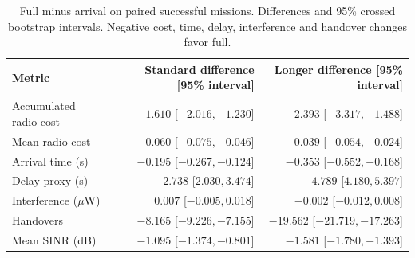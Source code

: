 \begin{table}[!t]\centering
\caption{Full minus arrival on paired successful missions. Differences and 95\% crossed bootstrap intervals. Negative cost, time, delay, interference and handover changes favor full.}
\label{tab:pairedradio}
\begin{tabular}{lrr}\toprule
Metric & Standard difference [95\% interval] & Longer difference [95\% interval]\\\midrule
Accumulated radio cost & $-1.610$ [$ -2.016, -1.230 $] & $-2.393$ [$ -3.317, -1.488 $]\\
Mean radio cost & $-0.060$ [$ -0.075, -0.046 $] & $-0.039$ [$ -0.054, -0.024 $]\\
Arrival time (s) & $-0.195$ [$ -0.267, -0.124 $] & $-0.353$ [$ -0.552, -0.168 $]\\
Delay proxy (s) & $2.738$ [$ 2.030, 3.474 $] & $4.789$ [$ 4.180, 5.397 $]\\
Interference ($\mu$W) & $0.007$ [$ -0.005, 0.018 $] & $-0.002$ [$ -0.012, 0.008 $]\\
Handovers & $-8.165$ [$ -9.226, -7.155 $] & $-19.562$ [$ -21.719, -17.263 $]\\
Mean SINR (dB) & $-1.095$ [$ -1.374, -0.801 $] & $-1.581$ [$ -1.780, -1.393 $]\\
\bottomrule\end{tabular}
\end{table}
